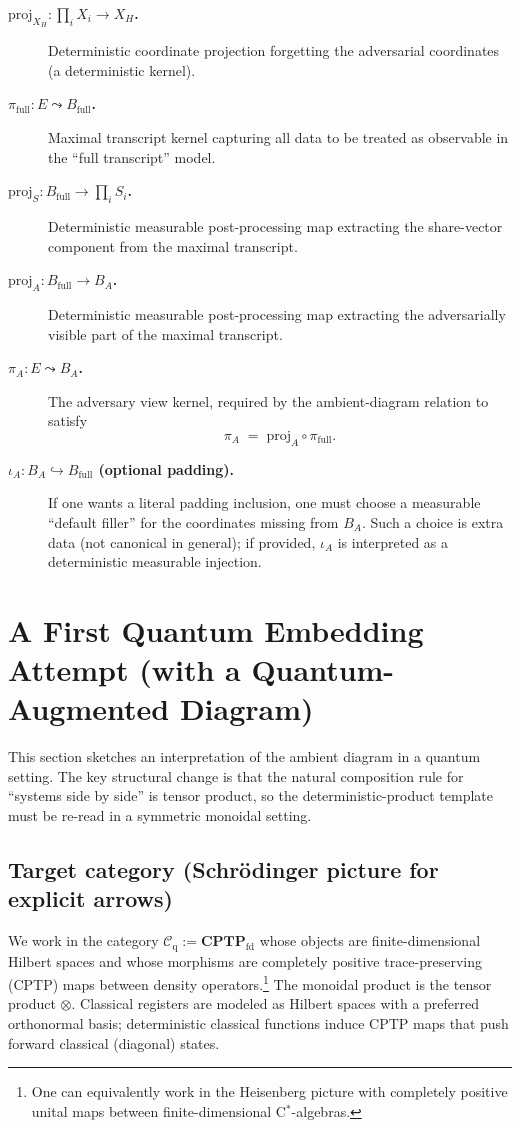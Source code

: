 \documentclass[11pt,a4paper]{article}
\theoremstyle{definition}
\theoremstyle{plain}
\begin{document}
\begin{description}
    \item[\textbf{$\mathrm{proj}_{X_H}:\prod_i X_i\to X_H$.}]
    Deterministic coordinate projection forgetting the adversarial coordinates (a deterministic kernel).

    \item[\textbf{$\pi_{\mathrm{full}}:E\leadsto B_{\mathrm{full}}$.}]
    Maximal transcript kernel capturing all data to be treated as observable in the ``full transcript'' model.

    \item[\textbf{$\mathrm{proj}_S:B_{\mathrm{full}}\to \prod_i S_i$.}]
    Deterministic measurable post-processing map extracting the share-vector component from the maximal transcript.

    \item[\textbf{$\mathrm{proj}_A:B_{\mathrm{full}}\to B_A$.}]
    Deterministic measurable post-processing map extracting the adversarially visible part of the maximal transcript.

    \item[\textbf{$\pi_A:E\leadsto B_A$.}]
    The adversary view kernel, required by the ambient-diagram relation to satisfy
    \[
    \pi_A \;=\; \mathrm{proj}_A\circ \pi_{\mathrm{full}}.
    \]

    \item[\textbf{$\iota_A:B_A\hookrightarrow B_{\mathrm{full}}$ (optional padding).}]
    If one wants a literal padding inclusion, one must choose a measurable ``default filler'' for the coordinates missing from $B_A$.
    Such a choice is extra data (not canonical in general); if provided, $\iota_A$ is interpreted as a deterministic measurable injection.
\end{description}

\section{A First Quantum Embedding Attempt (with a Quantum-Augmented Diagram)}
\label{sec:quantum}

This section sketches an interpretation of the ambient diagram in a quantum setting.
The key structural change is that the natural composition rule for ``systems side by side'' is tensor product, so the deterministic-product template must be re-read in a symmetric monoidal setting.

\subsection{Target category (Schr\"odinger picture for explicit arrows)}
We work in the category $\mathcal{C}_{\mathrm{q}}:=\mathbf{CPTP}_{\mathrm{fd}}$ whose objects are finite-dimensional Hilbert spaces and whose morphisms are completely positive trace-preserving (CPTP) maps between density operators.\footnote{One can equivalently work in the Heisenberg picture with completely positive unital maps between finite-dimensional C$^*$-algebras.}
The monoidal product is the tensor product $\otimes$.
Classical registers are modeled as Hilbert spaces with a preferred orthonormal basis; deterministic classical functions induce CPTP maps that push forward classical (diagonal) states.
\end{document}
